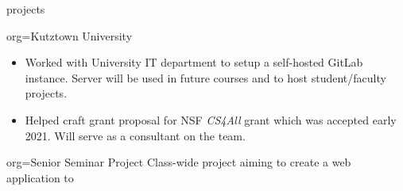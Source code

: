 \documentclass{resume}
\begin{document}
\begin{ResumeSection}{projects}
    \begin{ResumeSubsection}{org={Kutztown University}}
        \begin{itemize}
            \item Worked with University IT department to setup a self-hosted GitLab instance. Server will be used in future courses and to host student/faculty projects.
            \item Helped craft grant proposal for NSF \emph{CS4All} grant which was accepted early 2021. Will serve as a consultant on the team. 
        \end{itemize}
    \end{ResumeSubsection}
    \begin{ResumeSubsection}{org={Senior Seminar Project}}
        Class-wide project aiming to create a web application to 
    \end{ResumeSubsection}
\end{ResumeSection}
\end{document}
